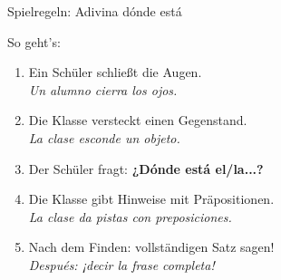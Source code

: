 \documentclass[aspectratio=169, 11pt]{beamer}
\newcommand{\estar}[1]{\textbf{\textcolor{blau}{#1}}}
\begin{document}
\begin{frame}{Spielregeln: Adivina dónde está}

\begin{block}{So geht's:}
\begin{enumerate}
    \item Ein Schüler schließt die Augen.\\
    {\footnotesize\textcolor{dunkelgrau}{\textit{Un alumno cierra los ojos.}}}
    \item Die Klasse versteckt einen Gegenstand.\\
    {\footnotesize\textcolor{dunkelgrau}{\textit{La clase esconde un objeto.}}}
    \item Der Schüler fragt: \estar{¿Dónde está el/la...?}
    \item Die Klasse gibt Hinweise mit Präpositionen.\\
    {\footnotesize\textcolor{dunkelgrau}{\textit{La clase da pistas con preposiciones.}}}
    \item Nach dem Finden: vollständigen Satz sagen!\\
    {\footnotesize\textcolor{dunkelgrau}{\textit{Después: ¡decir la frase completa!}}}
\end{enumerate}
\end{block}

\end{frame}
\end{document}
